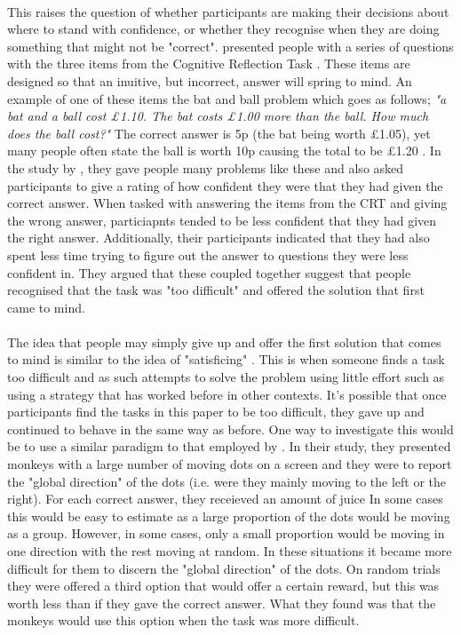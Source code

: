 \documentclass[12pt]{article}
\begin{document}
\paragraph{} This raises the question of whether participants are making their decisions about where to stand with confidence, or whether they recognise when they are doing something that might not be "correct". \cite{SZOLLOSI20171} presented people with a series of questions with the three items from the Cognitive Reflection Task \citep[CRT: ][]{Frederick2005CRT}. These items are designed so that an inuitive, but incorrect, answer will spring to mind. An example of one of these items the bat and ball problem which goes as follows; \textit{"a bat and a ball cost \pounds1.10. The bat costs \pounds1.00 more than the ball. How much does the ball cost?"} The correct answer is 5p (the bat being worth \pounds1.05), yet many people often state the ball is worth 10p causing the total to be \pounds1.20 \citep{Frederick2005CRT}. In the study by \cite{SZOLLOSI20171}, they gave people many problems like these and also asked participants to give a rating of how confident they were that they had given the correct answer. When tasked with answering the items from the CRT and giving the wrong answer, particiapnts tended to be less confident that they had given the right answer. Additionally, their participants indicated that they had also spent less time trying to figure out the answer to questions they were less confident in. They argued that these coupled together suggest that people recognised that the task was "too difficult" and offered the solution that first came to mind. 

\paragraph{} The idea that people may simply give up and offer the first solution that comes to mind is similar to the idea of "satisficing" \citep{simon1990invariants}. This is when someone finds a task too difficult and as such attempts to solve the problem using little effort such as using a strategy that has worked before in other contexts. It's possible that once participants find the tasks in this paper to be too difficult, they gave up and continued to behave in the same way as before. One way to investigate this would be to use a similar paradigm to that employed by \cite{Kiani759}. In their study, they presented monkeys with a large number of moving dots on a screen and they were to report the "global direction" of the dots (i.e. were they mainly moving to the left or the right). For each correct answer, they receieved an amount of juice In some cases this would be easy to estimate as a large proportion of the dots would be moving as a group. However, in some cases, only a small proportion would be moving in one direction with the rest moving at random. In these situations it became more difficult for them to discern the "global direction" of the dots. On random trials they were offered a third option that would offer a certain reward, but this was worth less than if they gave the correct answer. What they found was that the monkeys would use this option when the task was more difficult. 
\end{document}

